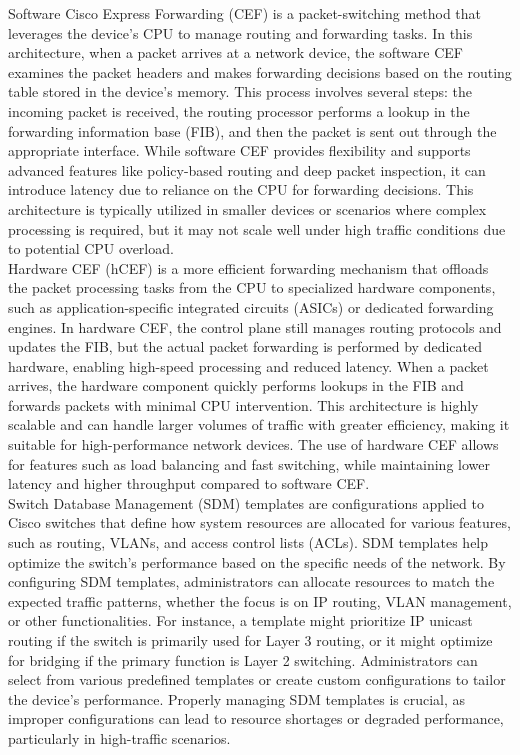 \documentclass{article}
\begin{document}
	Software Cisco Express Forwarding (CEF) is a packet-switching method that leverages the device's CPU to manage routing and forwarding tasks. In this architecture, when a packet arrives at a network device, the software CEF examines the packet headers and makes forwarding decisions based on the routing table stored in the device’s memory. This process involves several steps: the incoming packet is received, the routing processor performs a lookup in the forwarding information base (FIB), and then the packet is sent out through the appropriate interface. While software CEF provides flexibility and supports advanced features like policy-based routing and deep packet inspection, it can introduce latency due to reliance on the CPU for forwarding decisions. This architecture is typically utilized in smaller devices or scenarios where complex processing is required, but it may not scale well under high traffic conditions due to potential CPU overload.\\

	Hardware CEF (hCEF) is a more efficient forwarding mechanism that offloads the packet processing tasks from the CPU to specialized hardware components, such as application-specific integrated circuits (ASICs) or dedicated forwarding engines. In hardware CEF, the control plane still manages routing protocols and updates the FIB, but the actual packet forwarding is performed by dedicated hardware, enabling high-speed processing and reduced latency. When a packet arrives, the hardware component quickly performs lookups in the FIB and forwards packets with minimal CPU intervention. This architecture is highly scalable and can handle larger volumes of traffic with greater efficiency, making it suitable for high-performance network devices. The use of hardware CEF allows for features such as load balancing and fast switching, while maintaining lower latency and higher throughput compared to software CEF.\\

	Switch Database Management (SDM) templates are configurations applied to Cisco switches that define how system resources are allocated for various features, such as routing, VLANs, and access control lists (ACLs). SDM templates help optimize the switch's performance based on the specific needs of the network. By configuring SDM templates, administrators can allocate resources to match the expected traffic patterns, whether the focus is on IP routing, VLAN management, or other functionalities. For instance, a template might prioritize IP unicast routing if the switch is primarily used for Layer 3 routing, or it might optimize for bridging if the primary function is Layer 2 switching. Administrators can select from various predefined templates or create custom configurations to tailor the device's performance. Properly managing SDM templates is crucial, as improper configurations can lead to resource shortages or degraded performance, particularly in high-traffic scenarios.\\
\end{document}
